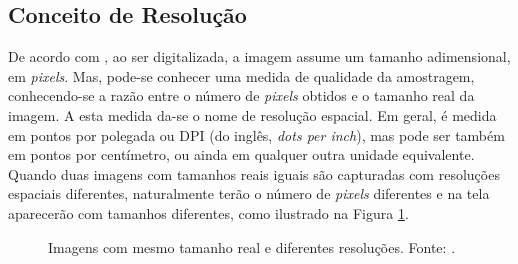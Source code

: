 \subsection{Conceito de Resolução} 
\label{resolucao}


De acordo com \cite{scuri1999fundamentos}, ao ser digitalizada, a imagem assume um tamanho adimensional, em \textit{pixels}. Mas, pode-se conhecer uma medida de qualidade da amostragem, conhecendo-se a razão entre o número de \textit{pixels} obtidos e o tamanho real da imagem. A esta medida da-se o nome de resolução espacial. Em geral, é medida em pontos por polegada ou DPI (do inglês, \textit{dots per inch}), mas pode ser também em pontos por centímetro, ou ainda em qualquer outra unidade equivalente. Quando duas imagens com tamanhos reais iguais são capturadas com resoluções espaciais diferentes, naturalmente terão o número de \textit{pixels} diferentes e na tela aparecerão com tamanhos diferentes, como ilustrado na Figura \ref{fig:res1}.

\begin{figure}[h]
    \centering
    \qquad
    \caption{Imagens com mesmo tamanho real e diferentes resoluções. Fonte: \cite{scuri1999fundamentos}.}%
	    \label{fig:res1}
\end{figure}

